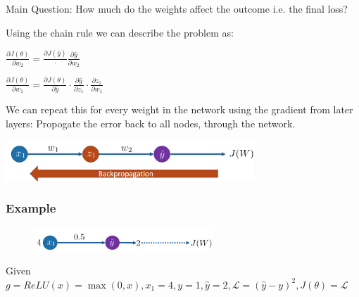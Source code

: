 \documentclass[
../../EiKI_Summary.tex,
]
{subfiles}
\begin{document}
\begin{defbox}
    Main Question: How much do the weights affect the outcome i.e. the final loss?

    Using the chain rule we can describe the problem as:

    \begin{minipage}
        [t]{0.5\textwidth}
        \centering
        \begin{csmb*}
            $\frac{\partial J(\theta)}{\partial w_2} = \frac{\partial J(\hat{y})} \cdot \frac{\partial \hat{y}}{\partial w_2}$
        \end{csmb*}
    \end{minipage}
    \begin{minipage}
        [t]{0.5\textwidth}
        \centering
        \begin{csmb*}
            $\frac{\partial J(\theta)}{\partial w_1} = \frac{\partial J(\theta)}{\partial \hat{y}} \cdot \frac{\partial \hat{y}}{\partial z_1}\cdot \frac{\partial z_1}{\partial w_1}$
        \end{csmb*}
    \end{minipage}

    We can repeat this for every weight in the network using the gradient from later layers: Propogate the error back to all nodes, through the network.

    \begin{center}
        \includegraphics[width=0.7\textwidth]{Pics/11/Backpropagation.png}
    \end{center}
\end{defbox}

\subsubsection*{Example}
\begin{figure}
    [H]
    \centering
    \includegraphics[width=0.6\textwidth]{Pics/11/BackpropagationExample.png}
\end{figure}

Given $g = ReLU(x) = \max(0,x),x_1 = 4,y = 1, \hat{y} = 2, \mathcal{L} = (\hat{y} - y)^2, J(\theta) = \mathcal{L}$
\end{document}
